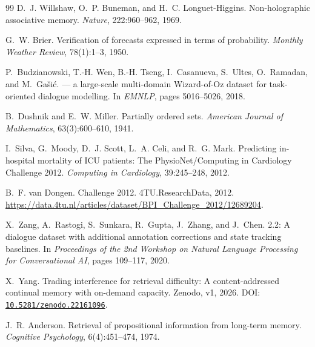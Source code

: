 \documentclass[11pt,a4paper]{article}
\theoremstyle{plain}
\theoremstyle{definition}
\theoremstyle{remark}
\begin{document}
\begin{thebibliography}{99}
D.~J. Willshaw, O.~P. Buneman, and H.~C. Longuet-Higgins.
\newblock Non-holographic associative memory.
\newblock \emph{Nature}, 222:960--962, 1969.

G.~W. Brier.
\newblock Verification of forecasts expressed in terms of probability.
\newblock \emph{Monthly Weather Review}, 78(1):1--3, 1950.

P.~Budzianowski, T.-H. Wen, B.-H. Tseng, I.~Casanueva, S.~Ultes, O.~Ramadan,
and M.~Ga\v{s}i\'c.
 --- a large-scale multi-domain {Wizard-of-Oz} dataset for
task-oriented dialogue modelling.
\newblock In \emph{EMNLP}, pages 5016--5026, 2018.

B.~Dushnik and E.~W. Miller.
\newblock Partially ordered sets.
\newblock \emph{American Journal of Mathematics}, 63(3):600--610, 1941.

I.~Silva, G.~Moody, D.~J. Scott, L.~A. Celi, and R.~G. Mark.
\newblock Predicting in-hospital mortality of {ICU} patients: The
{PhysioNet}/{Computing in Cardiology} Challenge 2012.
\newblock \emph{Computing in Cardiology}, 39:245--248, 2012.

B.~F. van Dongen.
 Challenge 2012.
\newblock 4TU.ResearchData, 2012.
\newblock \url{https://data.4tu.nl/articles/dataset/BPI_Challenge_2012/12689204}.

X.~Zang, A.~Rastogi, S.~Sunkara, R.~Gupta, J.~Zhang, and J.~Chen.
 2.2: A dialogue dataset with additional annotation
corrections and state tracking baselines.
\newblock In \emph{Proceedings of the 2nd Workshop on Natural Language
Processing for Conversational AI}, pages 109--117, 2020.

X.~Yang.
\newblock Trading interference for retrieval difficulty: A content-addressed
continual memory with on-demand capacity.
\newblock Zenodo, v1, 2026.
\newblock DOI:
\href{https://doi.org/10.5281/zenodo.22161096}{\texttt{10.5281/zenodo.22161096}}.


J.~R. Anderson.
\newblock Retrieval of propositional information from long-term memory.
\newblock \emph{Cognitive Psychology}, 6(4):451--474, 1974.


\end{thebibliography}
\end{document}
